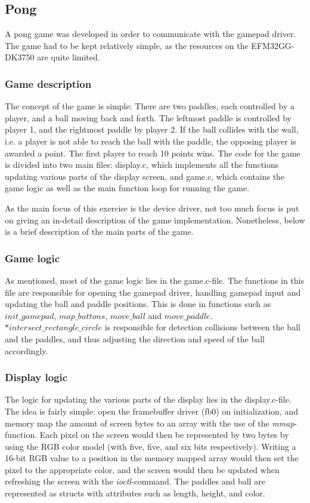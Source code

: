 \subsection{Pong}
A pong game was developed in order to communicate with the gamepad driver. The game had to be kept relatively simple, as the resources on the EFM32GG-DK3750 are quite limited.

\subsubsection{Game description}

The concept of the game is simple: There are two paddles, each controlled by a player, and a ball moving back and forth. The leftmost paddle is controlled by player 1, and the rightmost paddle by player 2. If the ball collides with the wall, i.e. a player is not able to reach the ball with the paddle, the opposing player is awarded a point. The first player to reach 10 points wins. The code for the game is divided into two main files: display.c, which implements all the functions updating various parts of the display screen, and game.c, which contains the game logic as well as the main function loop for running the game.

As the main focus of this exercise is the device driver, not too much focus is put on giving an in-detail description of the game implementation. Nonetheless, below is a brief description of the main parts of the game.

\subsubsection{Game logic}

As mentioned, most of the game logic lies in the game.c-file. The functions in this file are responsible for opening the gamepad driver, handling gamepad input and updating the ball and paddle positions. This is done in functions such as \emph{$init\_gamepad$}, \emph{$map\_buttons$}, \emph{$move\_ball$} and \emph{$move\_paddle$}. \emph{$*intersect\_rectangle\_circle$} is responsible for detection collisions between the ball and the paddles, and thus adjusting the direction and speed of the ball accordingly.

\subsubsection{Display logic}

The logic for updating the various parts of the display lies in the display.c-file. The idea is fairly simple: open the framebuffer driver (fb0) on initialization, and memory map the amount of screen bytes to an array with the use of the \emph{mmap}-function. Each pixel on the screen would then be represented by two bytes by using the RGB color model (with five, five, and six bits respectively). Writing a 16-bit RGB value to a position in the memory mapped array would then set the pixel to the appropriate color, and the screen would then be updated when refreshing the screen with the \emph{ioctl}-command. The paddles and ball are represented as structs with attributes such as length, height, and color.

